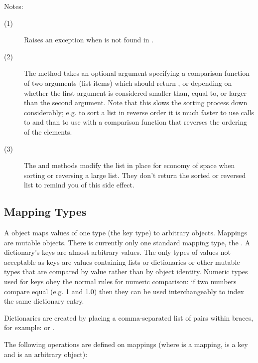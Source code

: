 \noindent
Notes:
\begin{description}
\item[(1)] Raises an exception when  is not found in .
  
\item[(2)] The  method takes an optional argument
  specifying a comparison function of two arguments (list items) which
  should return ,  or  depending on whether the
  first argument is considered smaller than, equal to, or larger than the
  second argument.  Note that this slows the sorting process down
  considerably; e.g. to sort a list in reverse order it is much faster
  to use calls to  and  than to use
   with a comparison function that reverses the ordering of
  the elements.

\item[(3)] The  and  methods modify the
list in place for economy of space when sorting or reversing a large
list.  They don't return the sorted or reversed list to remind you of
this side effect.

\end{description}

\subsection{Mapping Types}

A  object maps values of one type (the key type) to
arbitrary objects.  Mappings are mutable objects.  There is currently
only one standard mapping type, the .  A dictionary's keys are
almost arbitrary values.  The only types of values not acceptable as
keys are values containing lists or dictionaries or other mutable
types that are compared by value rather than by object identity.
Numeric types used for keys obey the normal rules for numeric
comparison: if two numbers compare equal (e.g. 1 and 1.0) then they
can be used interchangeably to index the same dictionary entry.


Dictionaries are created by placing a comma-separated list of
 pairs within braces, for example:
 or
.

The following operations are defined on mappings (where  is a
mapping,  is a key and  is an arbitrary object):

